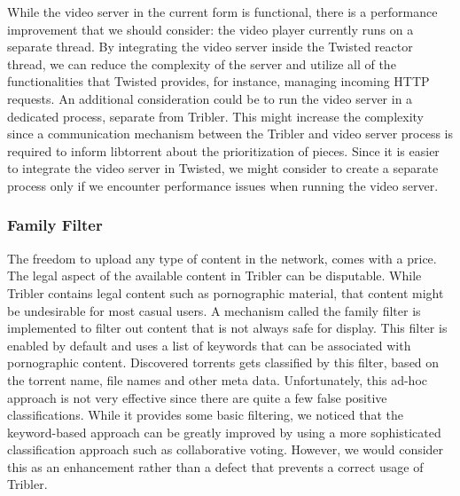 \noindent While the video server in the current form is functional, there is a performance improvement that we should consider: the video player currently runs on a separate thread. By integrating the video server inside the Twisted reactor thread, we can reduce the complexity of the server and utilize all of the functionalities that Twisted provides, for instance, managing incoming HTTP requests. An additional consideration could be to run the video server in a dedicated process, separate from Tribler. This might increase the complexity since a communication mechanism between the Tribler and video server process is required to inform libtorrent about the prioritization of pieces. Since it is easier to integrate the video server in Twisted, we might consider to create a separate process only if we encounter performance issues when running the video server.

\subsubsection{\textbf{Family Filter}}
The freedom to upload any type of content in the network, comes with a price. The legal aspect of the available content in Tribler can be disputable. While Tribler  contains legal content such as pornographic material, that content might be undesirable for most casual users. A mechanism called the family filter is  implemented to filter out content that is not always safe for display. This filter is enabled by default and uses a list of keywords that can be associated with pornographic content. Discovered torrents gets classified by this filter, based on the torrent name, file names and other meta data. Unfortunately, this ad-hoc approach is not very effective since there are quite a few false positive classifications. While it provides some basic filtering, we noticed that the keyword-based approach can be greatly improved by using a more sophisticated classification approach such as collaborative voting. However, we would consider this as an enhancement rather than a defect that prevents a correct usage of Tribler.

